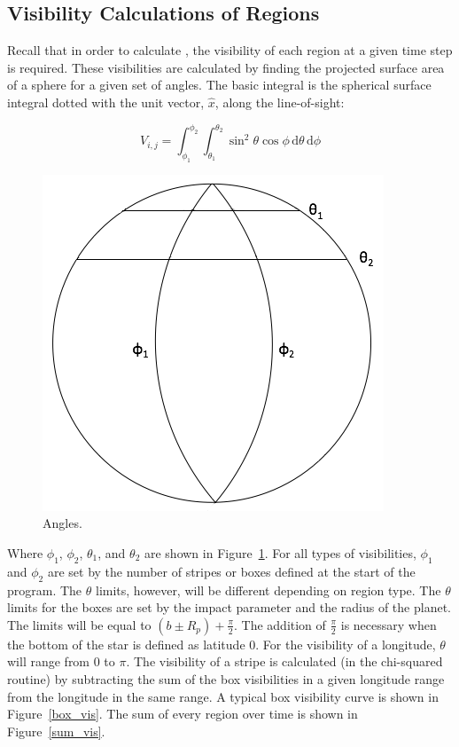 

\subsection{Visibility Calculations of Regions \label{vis}}
Recall that in order to calculate \fmod, the visibility of each region at a given time step is required. These visibilities are calculated by finding the projected surface area of a sphere for a given set of angles. The basic integral is the spherical surface integral dotted with the unit vector, $\hat{x}$, along the line-of-sight:

\begin{equation}
	V_{i,j} = \int_{\phi_1}^{\phi_2} \int_{\theta_1}^{\theta_2} \sin^2{\theta}\cos{\phi}\,\mathrm{d}\theta \, \mathrm{d}\phi
\end{equation}

\begin{figure}[h]
	\centering
	\includegraphics[width=.5\textwidth]{images/angles.png}
	\caption{Angles.}
	\label{angles}
\end{figure}

Where $\phi_1$, $\phi_2$, $\theta_1$, and $\theta_2$ are shown in Figure~\ref{angles}. For all types of visibilities, $\phi_1$ and $\phi_2$ are set by the number of stripes or boxes defined at the start of the program. The $\theta$ limits, however, will be different depending on region type.
The $\theta$ limits for the boxes are set by the impact parameter and the radius of the planet. The limits will be equal to $(b \pm R_p) + \frac{\pi}{2}$. The addition of $\frac{\pi}{2}$ is necessary when the bottom of the star is defined as latitude 0. For the visibility of a longitude, $\theta$ will range from 0 to $\pi$. The visibility of a stripe is calculated (in the chi-squared routine) by subtracting the sum of the box visibilities in a given longitude range from the longitude in the same range. A typical box visibility curve is shown in Figure~\ref{box_vis}. The sum of every region over time is shown in Figure~\ref{sum_vis}.

